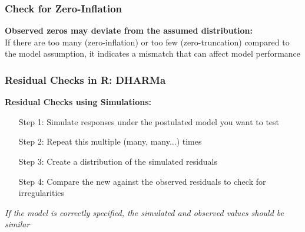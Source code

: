 \documentclass{beamer}
\newenvironment{VerbatimIN}
 {\VerbatimEnvironment
  \begin{tcolorbox}[
    breakable,
    colback=lightgray,
    spartan
  ]%
  \begin{Verbatim}}
 {\end{Verbatim}\end{tcolorbox}}
\begin{document}
\begin{frame}
    \frametitle{Check for Zero-Inflation}
    \large
    \textbf{Observed zeros may deviate from the assumed distribution:}\\
    If there are too many (zero-inflation) or too few (zero-truncation) compared to the model assumption, it indicates a mismatch that can affect model performance
\end{frame}

\begin{frame}[fragile]
    \large
    \frametitle{Residual Checks in R: DHARMa}
    \textbf{Residual Checks using Simulations:}
    \begin{itemize}
        \item[Step 1:] Simulate responses under the postulated model you want to test
        \item[Step 2:] Repeat this multiple (many, many...) times 
        \item[Step 3:] Create a distribution of the simulated residuals
        \item[Step 4:] Compare the new against the observed residuals to check for irregularities  
    \end{itemize}
    \vspace{0.2cm}
    
    \textit{If the model is correctly specified, the simulated and observed values should be similar}
\end{frame}

\end{document}
